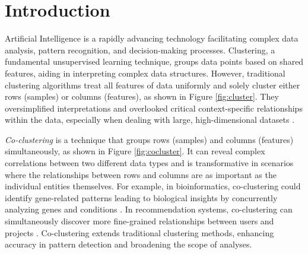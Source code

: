 \documentclass[letterpaper, 10 pt, conference]{ieeeconf}  %
\begin{document}
\section{Introduction}
Artificial Intelligence is a rapidly advancing technology facilitating complex data analysis, pattern recognition, and decision-making processes. Clustering, a fundamental unsupervised learning technique, groups data points based on shared features, aiding in interpreting complex data structures. However, traditional clustering algorithms \cite{zhang2023AdaptiveGraphConvolution, wu2023EffectiveClusteringStructured} treat all features of data uniformly and solely cluster either rows (samples) or columns (features),  as shown in Figure \ref{fig:cluster}. They oversimplified interpretations and overlooked critical context-specific relationships within the data, especially when dealing with large, high-dimensional datasets \cite{chen2023FastFlexibleBipartite, zhao2023MultiviewCoclusteringMultisimilarity, kumar2023CoclusteringBasedMethods}.

\textit{Co-clustering} \cite{kluger2003SpectralBiclusteringMicroarray, yan2017CoclusteringMultidimensionalBig} is a technique that groups rows (samples) and columns (features) simultaneously, as shown in Figure \ref{fig:cocluster}. It can reveal complex correlations between two different data types and is transformative in scenarios where the relationships between rows and columns are as important as the individual entities themselves. For example, in bioinformatics, co-clustering could identify gene-related patterns leading to biological insights by concurrently analyzing genes and conditions \cite{higham2007SpectralClusteringIts, kluger2003SpectralBiclusteringMicroarray, zhao2012BiclusteringAnalysisPattern}. In recommendation systems, co-clustering can simultaneously discover more fine-grained relationships between users and projects \cite{dhillon2007WeightedGraphCuts, chen2023ParallelNonNegativeMatrix}. Co-clustering extends traditional clustering methods, enhancing accuracy in pattern detection and broadening the scope of analyses.
\end{document}
